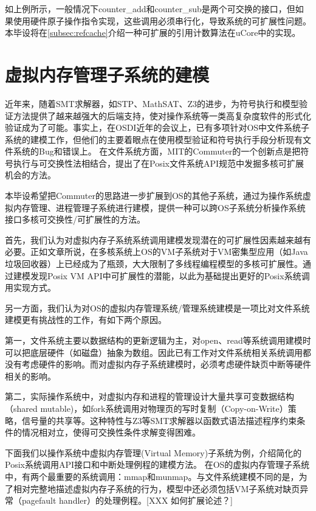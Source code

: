 如上例所示，一般情况下counter\_add和counter\_sub是两个可交换的接口，但如果使用硬件原子操作指令实现，这些调用必须串行化，导致系统的可扩展性问题。本毕设将在\ref{subsec:refcache}介绍一种可扩展的引用计数算法在uCore中的实现。

\section{虚拟内存管理子系统的建模}
\label{sec:vm-model}

近年来，随着SMT求解器，如STP、MathSAT、Z3\cite{DeMoura:2008:ZES:1792734.1792766}的进步，为符号执行和模型验证方法提供了越来越强大的后端支持，使对操作系统等一类高复杂度软件的形式化验证成为了可能。事实上，在OSDI近年的会议上，已有多项针对OS中文件系统子系统的建模工作\cite{radixvm:eurosys13}\cite{Yang:2006:UMC:1189256.1189259}，但他们的主要着眼点在使用模型验证和符号执行手段分析现有文件系统的Bug和错误上。
在文件系统方面，MIT的Commuter\cite{commuter:2013}的一个创新点是把符号执行与可交换性法相结合，提出了在Posix文件系统API规范中发掘多核可扩展机会的方法。

本毕设希望把Commuter的思路进一步扩展到OS的其他子系统，通过为操作系统虚拟内存管理、进程管理子系统进行建模，提供一种可以跨OS子系统分析操作系统接口多核可交换性/可扩展性的方法。

首先，我们认为对虚拟内存子系统系统调用建模发现潜在的可扩展性因素越来越有必要。正如文章\cite{radixvm:eurosys13}所说，在多核系统上OS的VM子系统对于VM密集型应用（如Java垃圾回收器）上已经成为了瓶颈，大大限制了多线程编程模型的多核可扩展性。通过建模发现Posix
VM API中可扩展性的潜能，以此为基础提出更好的Posix系统调用实现方式。

另一方面，我们认为对OS的虚拟内存管理系统/管理系统建模是一项比对文件系统建模更有挑战性的工作，有如下两个原因。

第一，文件系统主要以数据结构的更新逻辑为主，对open、read等系统调用建模时可以把底层硬件（如磁盘）抽象为数组。因此已有工作对文件系统相关系统调用都没有考虑硬件的影响。而对虚拟内存子系统建模时，必须考虑硬件缺页中断等硬件相关的影响。

第二，实际操作系统中，对虚拟内存和进程的管理设计大量共享可变数据结构（shared
mutable)，如fork系统调用对物理页的写时复制（Copy-on-Write）策略，信号量的共享等。这种特性与Z3等SMT求解器以函数式语法描述程序约束条件的情况相对立，使得可交换性条件求解变得困难。

下面我们以操作系统中虚拟内存管理(Virtual Memory)子系统为例，介绍简化的Posix系统调用API接口和中断处理例程的建模方法。
在OS的虚拟内存管理子系统中，有两个最重要的系统调用：mmap和munmap。与文件系统建模不同的是，为了相对完整地描述虚拟内存子系统的行为，模型中还必须包括VM子系统对缺页异常（pagefault
handler）的处理例程。[XXX 如何扩展论述？]

